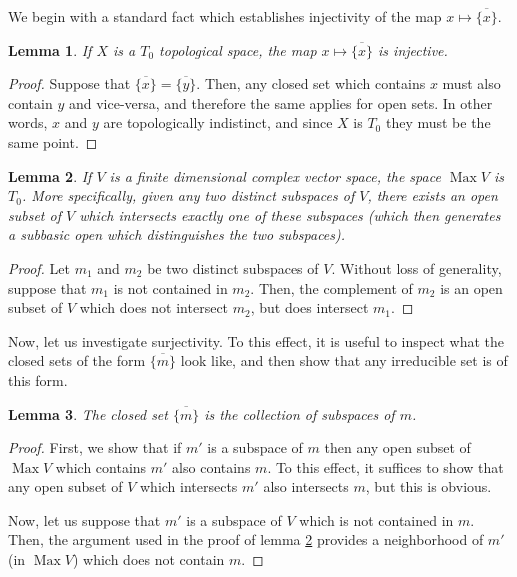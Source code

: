\documentclass{article}
\theoremstyle{plain}
\newtheorem{lemma}{Lemma}
\theoremstyle{nonumberplain}
\newtheorem{proof}{Proof}
\DeclareMathOperator{\Max}{Max}
\begin{document}
We begin with a standard fact which establishes injectivity of the map $x \mapsto \overline{\{x\}}$.

\begin{lemma}\label{lemma:2}
If $X$ is a $T_0$ topological space, the map $x \mapsto \overline{\{x\}}$ is injective.
\end{lemma}

\begin{proof}
Suppose that $\overline{\{x\}} = \overline{\{y\}}$. Then, any closed set which contains $x$ must also contain $y$ and vice-versa, and therefore the same applies for open sets. In other words, $x$ and $y$ are topologically indistinct, and since $X$ is $T_0$ they must be the same point.
\end{proof}

\begin{lemma}\label{maxist0}
If $V$ is a finite dimensional complex vector space, the space $\Max V$ is $T_0$. More specifically, given any two distinct subspaces of $V$, there exists an open subset of $V$ which intersects exactly one of these subspaces (which then generates a subbasic open which distinguishes the two subspaces).
\end{lemma}

\begin{proof}
Let $m_1$ and $m_2$ be two distinct subspaces of $V$. Without loss of generality, suppose that $m_1$ is not contained in $m_2$. Then, the complement of $m_2$ is an open subset of $V$ which does not intersect $m_2$, but does intersect $m_1$.
\end{proof}

Now, let us investigate surjectivity. To this effect, it is useful to inspect what the closed sets of the form $\overline{\{m\}}$ look like, and then show that any irreducible set is of this form.

\begin{lemma}
The closed set $\overline{\{m\}}$ is the collection of subspaces of $m$.
\end{lemma}

\begin{proof}
First, we show that if $m'$ is a subspace of $m$ then any open subset of $\Max V$ which contains $m'$ also contains $m$. To this effect, it suffices to show that any open subset of $V$ which intersects $m'$ also intersects $m$, but this is obvious.

Now, let us suppose that $m'$ is a subspace of $V$ which is not contained in $m$. Then, the argument used in the proof of lemma \ref{maxist0} provides a neighborhood of $m'$ (in $\Max V$) which does not contain $m$.
\end{proof}
\end{document}
